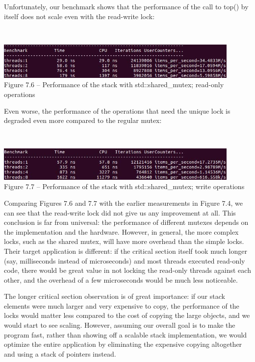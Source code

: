 Unfortunately, our benchmark shows that the performance of the call to top() by itself does not scale even with the read-write lock:

\hspace*{\fill} \\ %
\begin{center}
\includegraphics[width=0.9\textwidth]{content/2/chapter7/images/6.jpg}\\
Figure 7.6 – Performance of the stack with std::shared\_mutex; read-only operations
\end{center}

Even worse, the performance of the operations that need the unique lock is degraded even more compared to the regular mutex:

\hspace*{\fill} \\ %
\begin{center}
\includegraphics[width=0.9\textwidth]{content/2/chapter7/images/7.jpg}\\
Figure 7.7 – Performance of the stack with std::shared\_mutex; write operations
\end{center}

Comparing Figures 7.6 and 7.7 with the earlier measurements in Figure 7.4, we can see that the read-write lock did not give us any improvement at all. This conclusion is far from universal: the performance of different mutexes depends on the implementation and the hardware. However, in general, the more complex locks, such as the shared mutex, will have more overhead than the simple locks. Their target application is different: if the critical section itself took much longer (say, milliseconds instead of microseconds) and most threads executed read-only code, there would be great value in not locking the read-only threads against each other, and the overhead of a few microseconds would be much less noticeable.

The longer critical section observation is of great importance: if our stack elements were much larger and very expensive to copy, the performance of the locks would matter less compared to the cost of copying the large objects, and we would start to see scaling. However, assuming our overall goal is to make the program fast, rather than showing off a scalable stack implementation, we would optimize the entire application by eliminating the expensive copying altogether and using a stack of pointers instead.

